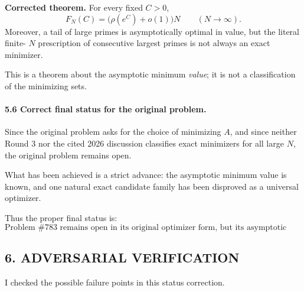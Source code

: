 \medskip

\noindent\textbf{Corrected theorem.}
For every fixed $C>0$,
\[
F_N(C)=\bigl(\rho(e^C)+o(1)\bigr)N
\qquad (N\to\infty).
\]
Moreover, a tail of large primes is asymptotically optimal in value, but the literal finite-
$N$ prescription of consecutive largest primes is not always an exact minimizer.

\medskip

This is a theorem about the asymptotic minimum \emph{value}; it is not a classification of the minimizing sets.

\paragraph{5.6 Correct final status for the original problem.}

Since the original problem asks for the choice of minimizing $A$, and since neither Round 3 nor the cited 2026 discussion classifies exact minimizers for all large $N$, the original problem remains open.

What has been achieved is a strict advance: the asymptotic minimum value is known, and one natural exact candidate family has been disproved as a universal optimizer.

Thus the proper final status is:
\[
\boxed{\text{Problem \#783 remains open in its original optimizer form, but its asymptotic value problem is solved.}}
\]

\subsection*{6. ADVERSARIAL VERIFICATION}

I checked the possible failure points in this status correction.

